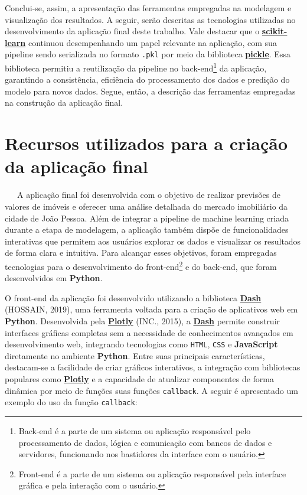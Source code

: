 \documentclass[
  12pt,
  a4paper,
]{scrreprt}
\begin{document}
\vspace{12pt}

Conclui-se, assim, a apresentação das ferramentas empregadas na
modelagem e visualização dos resultados. A seguir, serão descritas as
tecnologias utilizadas no desenvolvimento da aplicação final deste
trabalho. Vale destacar que o
\href{https://scikit-learn.org/stable/}{\textbf{scikit-learn}} continuou
desempenhando um papel relevante na aplicação, com sua pipeline sendo
serializada no formato \texttt{.pkl} por meio da biblioteca
\href{https://docs.python.org/3/library/pickle.html}{\textbf{pickle}}.
Essa biblioteca permitiu a reutilização da pipeline no
back-end\footnote{Back-end é a parte de um sistema ou aplicação
  responsável pelo processamento de dados, lógica e comunicação com
  bancos de dados e servidores, funcionando nos bastidores da interface
  com o usuário.} da aplicação, garantindo a consistência, eficiência do
processamento dos dados e predição do modelo para novos dados. Segue,
então, a descrição das ferramentas empregadas na construção da aplicação
final.

\section{Recursos utilizados para a criação da aplicação
final}\label{recursos-utilizados-para-a-criauxe7uxe3o-da-aplicauxe7uxe3o-final}

~~~A aplicação final foi desenvolvida com o objetivo de realizar
previsões de valores de imóveis e oferecer uma análise detalhada do
mercado imobiliário da cidade de João Pessoa. Além de integrar a
pipeline de machine learning criada durante a etapa de modelagem, a
aplicação também dispõe de funcionalidades interativas que permitem aos
usuários explorar os dados e visualizar os resultados de forma clara e
intuitiva. Para alcançar esses objetivos, foram empregadas tecnologias
para o desenvolvimento do front-end\footnote{Front-end é a parte de um
  sistema ou aplicação responsável pela interface gráfica e pela
  interação com o usuário.} e do back-end, que foram desenvolvidos em
\textbf{Python}.

\vspace{12pt}

O front-end da aplicação foi desenvolvido utilizando a biblioteca
\href{https://dash.plotly.com/}{\textbf{Dash}} (HOSSAIN, 2019), uma
ferramenta voltada para a criação de aplicativos web em \textbf{Python}.
Desenvolvida pela \href{https://plotly.com/}{\textbf{Plotly}} (INC.,
2015), a \href{https://dash.plotly.com/}{\textbf{Dash}} permite
construir interfaces gráficas completas sem a necessidade de
conhecimentos avançados em desenvolvimento web, integrando tecnologias
como \texttt{HTML}, \texttt{CSS} e \textbf{JavaScript} diretamente no
ambiente \textbf{Python}. Entre suas principais características,
destacam-se a facilidade de criar gráficos interativos, a integração com
bibliotecas populares como \href{https://plotly.com/}{\textbf{Plotly}} e
a capacidade de atualizar componentes de forma dinâmica por meio de
funções suas funções \texttt{callback}. A seguir é apresentado um
exemplo do uso da função \texttt{callback}:
\end{document}
